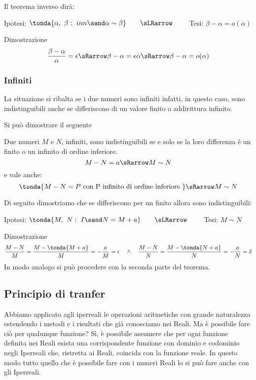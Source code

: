 \pagebreak %

Il teorema inverso dirà:
\begin{center}
Ipotesi: \(\tonda{\alpha,~\beta:\ inn \sand \alpha \sim \beta}
\qquad \sLRarrow \qquad\) 
Tesi: \(\beta-\alpha = o(\alpha)\)
\end{center}
Dimostrazione
\[\frac{\beta - \alpha}{\alpha} = \epsilon \sRarrow 
\beta - \alpha =\epsilon \alpha \sRarrow 
\beta - \alpha = o(\alpha)
\]

\subsubsection{Infiniti}
\label{subsubsec:insnum_infiniti}

La situazione si ribalta se i due numeri sono infiniti infatti, in 
questo caso, sono indistinguibili anche se differiscono di 
un valore finito o addirittura infinito. 

Si può dimostrare il seguente
\begin{teorema}
Due numeri \(M\) e \(N\), infiniti, 
sono indistinguibili se e solo se la loro differenza è un finito o 
un infinito di ordine inferiore.
\[M-N = a \sRarrow M \sim N\] 
e vale anche:
\[\tonda{M-N = P \text{ con P infinito di ordine inferiore }} 
\sRarrow M \sim N\] 
\end{teorema}
Di seguito dimostriamo che se differiscono per un finito allora 
sono indistinguibili:
\begin{center}
Ipotesi: \(\tonda{M,~N:\ I \sand N = M+a}
\qquad \sLRarrow\qquad\) 
Tesi: \(M \sim N\)
\end{center}
Dimostrazione
\[\frac{M-N}{M}=
\frac{M-\tonda{M +a}}{M} = 
-\frac{a}{M}= \epsilon \quad \wedge \quad 
\frac{M-N}{N}=
\frac{M-\tonda{N +a}}{N} = 
-\frac{a}{N}= \delta
\]
In modo analogo si può procedere con la seconda parte del teorema.

\subsection{Principio di tranfer}
\label{subsec:insnum_nonarchimedei}

Abbiamo applicato agli iperreali le operazioni aritmetiche con grande 
naturalezza estendendo i metodi e i risultati che già conosciamo nei Reali. 
Ma è possibile fare ciò per qualunque funzione? 
Sì, è possibile assumere che per ogni funzione definita nei Reali esista 
una corrispondente funzione con dominio e codominio negli Iperreali che, 
ristretta ai Reali, coincida con la funzione reale.
In questo modo tutto quello che è possibile fare con i numeri Reali lo si 
può fare anche con gli Iperreali.


